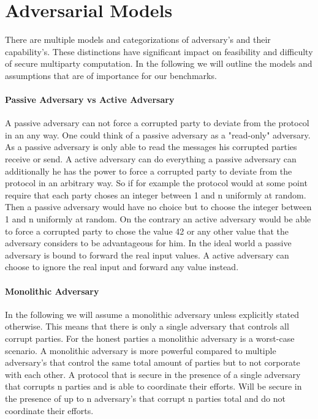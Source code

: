      

\section{Adversarial Models}
\label{sec:Adversarial Models}
There are multiple models and categorizations of adversary's and their capability's. These distinctions have significant impact on feasibility and difficulty of secure multiparty computation. In the following we will outline the models and assumptions that are of importance for our benchmarks. 

\paragraph{Passive Adversary vs Active Adversary}
A passive adversary can not force a corrupted party to deviate from the protocol in an any way. One could think of a passive adversary as a "read-only" adversary. As a passive adversary is only able to read the messages his corrupted parties receive or send. A active adversary can do everything a passive adversary can additionally he has the power to force a corrupted party to deviate from the protocol in an arbitrary way. So if for example the protocol would at some point require that each party choses an integer between 1 and n uniformly at random. 
Then a passive adversary would have no choice but to choose the integer between 1 and n uniformly at random. 
On the contrary an active adversary would be able to force a corrupted party to chose the value 42 or any other value that the adversary considers to be advantageous for him. In the ideal world a passive adversary is bound to forward the real input values. A active adversary can choose to ignore the real input and forward any value instead.

\paragraph{Monolithic Adversary}
In the following we will assume a monolithic adversary unless explicitly stated otherwise. This means that there is only a single adversary that controls all corrupt parties. For the honest parties a monolithic adversary is a worst-case scenario. A monolithic adversary is more powerful compared to multiple adversary's that control the same total amount of parties but to not corporate with each other. A protocol that is secure in the presence of a single adversary that corrupts n parties and is able to coordinate their efforts. Will be secure in the presence of up to n adversary's that corrupt n parties total and do not coordinate their efforts.   
